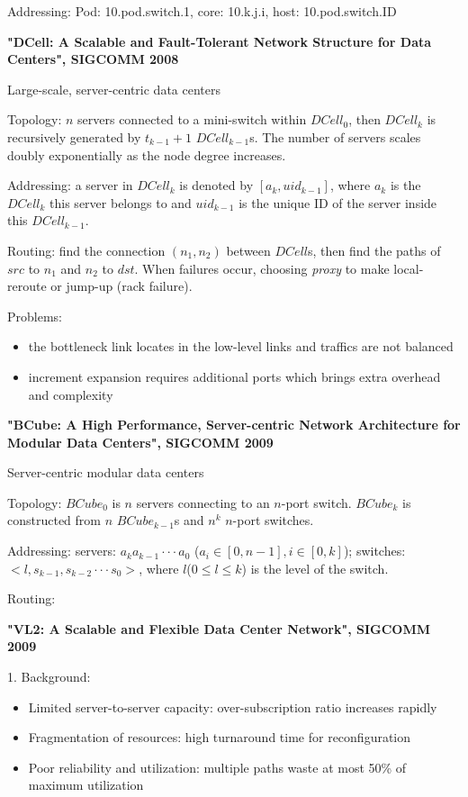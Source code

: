 \documentclass[journal,onecolumn,11pt]{IEEEtran}
\begin{document}
Addressing: Pod: 10.pod.switch.1, core: 10.k.j.i, host: 10.pod.switch.ID

\textbf{"DCell: A Scalable and Fault-Tolerant Network Structure for Data Centers", SIGCOMM 2008}

Large-scale, server-centric data centers

Topology:
$n$ servers connected to a mini-switch within $DCell_0$, then $DCell_k$ is recursively generated by $t_{k-1}+1$ $DCell_{k-1}$s. The number of servers scales doubly exponentially as the node degree increases.

Addressing:
a server in $DCell_k$ is denoted by $[a_k,uid_{k-1}]$, where $a_k$ is the $DCell_k$ this server belongs to and $uid_{k-1}$ is the unique ID of the server inside this $DCell_{k-1}$.

Routing: find the connection $(n_1,n_2)$ between $DCell$s, then find the paths of $src$ to $n_1$ and $n_2$ to $dst$. When failures occur, choosing \textit{proxy} to make local-reroute or jump-up (rack failure).

Problems:
\begin{itemize}
  \item the bottleneck link locates in the low-level links and traffics are not balanced
  \item increment expansion requires additional ports which brings extra overhead and complexity
\end{itemize}


\textbf{"BCube: A High Performance, Server-centric Network Architecture for Modular Data Centers", SIGCOMM 2009}

Server-centric modular data centers

Topology:
$BCube_0$ is $n$ servers connecting to an $n$-port switch. $BCube_k$ is constructed from $n$ $BCube_{k-1}$s and $n^k$ $n$-port switches.

Addressing:
servers: $a_ka_{k-1}\cdot\cdot\cdot a_0$ ($a_i\in [0,n-1],i\in [0,k]$); switches: $<l,s_{k-1},s_{k-2}\cdot\cdot\cdot s_0>$, where $l$($0\leq l\leq k$) is the level of the switch.

Routing:


\textbf{"VL2: A Scalable and Flexible Data Center Network", SIGCOMM 2009}

1. Background:
\begin{itemize}
  \item Limited server-to-server capacity: over-subscription ratio increases rapidly
  \item Fragmentation of resources: high turnaround time for reconfiguration
  \item Poor reliability and utilization: multiple paths waste at most 50\% of maximum utilization
\end{itemize}
\end{document}
